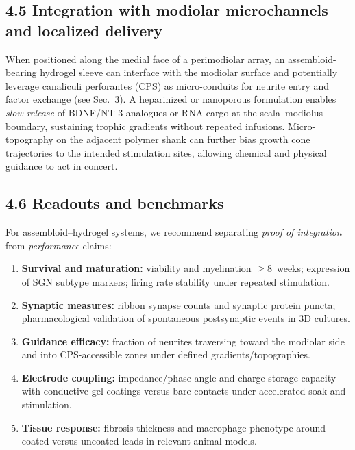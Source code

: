 \subsection*{4.5 Integration with modiolar microchannels and localized delivery}
When positioned along the medial face of a perimodiolar array, an assembloid-bearing hydrogel sleeve can interface with the modiolar surface and potentially leverage canaliculi perforantes (CPS) as micro-conduits for neurite entry and factor exchange (see Sec.~3). A heparinized or nanoporous formulation enables \emph{slow release} of BDNF/NT-3 analogues or RNA cargo at the scala–modiolus boundary, sustaining trophic gradients without repeated infusions.\citep{Chikar2012Biomaterials,Johansen2018PLoSOne,StPeter2022FrontBioeng} Micro-topography on the adjacent polymer shank can further bias growth cone trajectories to the intended stimulation sites, allowing chemical and physical guidance to act in concert.\citep{Truong2021HearRes,Vecchi2024JNE}

\subsection*{4.6 Readouts and benchmarks}
For assembloid–hydrogel systems, we recommend separating \emph{proof of integration} from \emph{performance} claims:
\begin{enumerate}
	\item \textbf{Survival and maturation:} viability and myelination $\geq$8~weeks; expression of SGN subtype markers; firing rate stability under repeated stimulation.\citep{Xia2023StemCellReports,Moss2024iScience}
	\item \textbf{Synaptic measures:} ribbon synapse counts and synaptic protein puncta; pharmacological validation of spontaneous postsynaptic events in 3D cultures.\citep{Hergenreder2024NatBiotech}
	\item \textbf{Guidance efficacy:} fraction of neurites traversing toward the modiolar side and into CPS-accessible zones under defined gradients/topographies.\citep{Truong2021HearRes,Vecchi2024JNE}
	\item \textbf{Electrode coupling:} impedance/phase angle and charge storage capacity with conductive gel coatings versus bare contacts under accelerated soak and stimulation.
	\item \textbf{Tissue response:} fibrosis thickness and macrophage phenotype around coated versus uncoated leads in relevant animal models.\citep{Horne2023ActaBiomaterialia,Fibranz2025JFB}
\end{enumerate}

